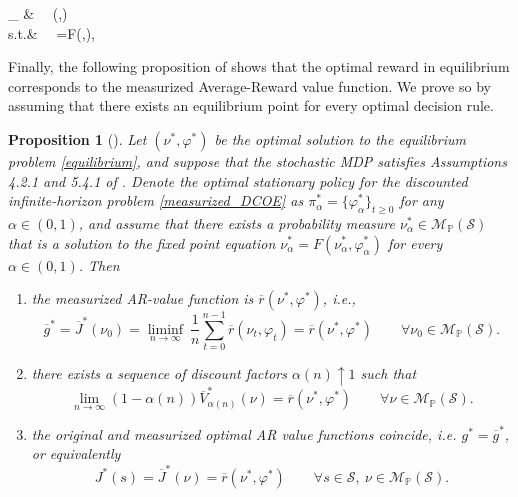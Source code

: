 \documentclass[12pt,a4paper]{article}
\newtheorem{proposition}{Proposition}
\newcommand{\mS}{\mathcal{S}}
\newcommand{\mMpS}{\mathcal{M}_{\mathbb{P}}(\mathcal{S})}
\newcommand{\oV}{\overline{V}}
\newcommand{\ovr}{\overline{r}}
\begin{document}
		\begin{flalign*}%
			\sup_{\substack{\nu \in \mMpS \\ \varphi \in \Phi}} & \ \ \ovr(\nu,\varphi)  \\
			\mbox{s.t.}& \ \ \nu=F(\nu,\varphi), \nonumber
		\end{flalign*}
		
		Finally, the following proposition of \cite{measurized} shows that the optimal reward in equilibrium corresponds to the measurized Average-Reward value function. We prove so by assuming that there exists an equilibrium point for every optimal decision rule.
		\begin{proposition}[\cite{measurized}]\label{prop:equilibrium_AROI}
			Let $(\nu^*,\varphi^*)$ be the optimal solution to the equilibrium problem \eqref{equilibrium}, and suppose that the stochastic MDP satisfies Assumptions 4.2.1 and 5.4.1 of \cite{lerma}. Denote the optimal stationary policy for the discounted infinite-horizon problem \eqref{measurized_DCOE} as $\pi^*_\alpha=\{\varphi_\alpha^*\}_{t \geq 0}$ for any $\alpha \in (0,1)$, and assume that there exists a probability measure $\nu_\alpha^*\in \mMpS$ that is a solution to the fixed point equation $\nu_\alpha^*=F(\nu_\alpha^*,\varphi_\alpha^*)$ for every $\alpha \in (0,1)$. Then 
			\begin{enumerate}
				\item[(a)] the measurized AR-value function is $\ovr(\nu^*,\varphi^*)$, i.e.,
				\begin{equation*}\label{Jopt}
					\overline{g}^*=\overline{J}^*(\nu_0)=\liminf_{n \rightarrow \infty} \ \frac{1}{n}  \sum_{t=0}^{n-1} \ovr(\nu_t,\varphi_t)=\ovr(\nu^*,\varphi^*) \qquad \forall \nu_0 \in \mMpS.
				\end{equation*}
				\item[(b)] there exists a sequence of discount factors $\alpha(n) \uparrow 1$ such that 
				\begin{equation*}\label{vanishing_discount}
					\lim_{n \rightarrow \infty} (1-\alpha(n)) \oV^*_{\alpha(n)}(\nu)=\ovr(\nu^*,\varphi^*) \qquad \forall \nu \in \mMpS.
				\end{equation*}
				
				\item[(c)] the original and measurized optimal AR value functions coincide, i.e. $g^*=\overline{g}^*$, or equivalently
				\begin{equation*}\label{same_J}
					J^*(s)=\overline{J}^*(\nu)=\ovr(\nu^*,\varphi^*) \qquad \forall s \in \mS, \ \nu \in \mMpS.
				\end{equation*}
			\end{enumerate}
		\end{proposition}
		
\end{document}

